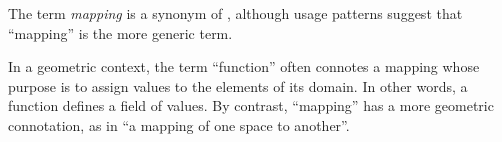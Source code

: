 \documentclass{article}
\begin{document}
The term \emph{mapping} is a synonym of , although usage patterns suggest that  ``mapping'' is the more generic term.

In a geometric context, the term ``function'' often connotes a mapping whose purpose is to assign values to the elements of its domain. In other words, a function defines a field of values.  By contrast, ``mapping'' has a more geometric connotation, as in ``a mapping of one space to another''.
\end{document}
